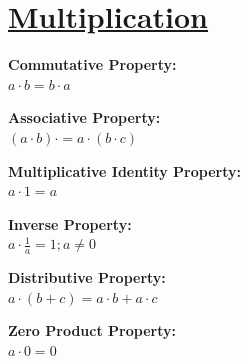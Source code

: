 \documentclass[12pt]{article}
\begin{document}
\section*{\underline{\textbf{Multiplication}}}
\begin{minipage}{\textwidth}
    \textbf{Commutative Property:}
    \\ \( a \cdot b = b \cdot a \)
\end{minipage}
\begin{minipage}{\textwidth}
    \textbf{Associative Property:}
    \\ \( (a \cdot b) \cdot = a \cdot (b \cdot c) \)
\end{minipage}
\begin{minipage}{\textwidth}
    \textbf{Multiplicative Identity Property:}
    \\ \( a \cdot 1 = a \)
\end{minipage}
\begin{minipage}{\textwidth}
    \textbf{Inverse Property:}
    \\ \( a \cdot \displaystyle\frac{ 1 }{ a } = 1 ; a \ne 0 \)
\end{minipage}
\begin{minipage}{\textwidth}
    \textbf{Distributive Property:}
    \\ \( a \cdot (b + c) = a \cdot b + a \cdot c \)
\end{minipage}
\begin{minipage}{\textwidth}
    \textbf{Zero Product Property:}
    \\ \( a \cdot 0 = 0 \)
\end{minipage}
\end{document}
